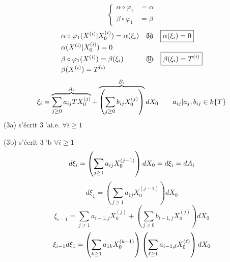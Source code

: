 \[
 \left\{\begin{aligned}\alpha\circ\varphi_1&=\alpha\\\beta\circ\varphi_1&=\beta\end{aligned}\right.
\]
\[
 \begin{array}{ll}
 \alpha\circ\varphi_1({X^{(i)}|X_0^{(i)}})=\alpha(\xi_i)&
 \text{\textcircled{3a}}\quad\boxed{\alpha(\xi_i)=0}\\
 \alpha({X^{(i)}|X_0^{(i)}})=0&\\
 \beta\circ\varphi_1(X^{(i)})=\beta(\xi_i)&
 \text{\textcircled{3b}}\quad\boxed{\beta(\xi_i)=T^{(i)}}\\
 \beta(X^{(i)})=T^{(i)}&
 \end{array}
\]
\[
 \xi_i=\overbrace{\sum_{j\geq0}a_{ij}{{T}}X_0^{(j)}}^{A_i}
 +\overbrace{\left(\sum_{j\geq0}b_{ij}X_0^{(j)}\right)}^{B_i}dX_0
 \qquad {a_{ij}|a_j},b_{ij}\in k\{T\}
\]
(3a) s'écrit
\textcircled{3'a}\quad i.e.
$\forall i\geq1$

(3b) s'écrit
\textcircled{3'b}
$\forall i\geq1$
\[
 d\xi_i=\left(\sum_{j\geq1}a_{ij}X_0^{(j-1)}\right)dX_0
 ={{d\xi_i=dA_i}}
\]
\[
 d\xi_1=\left(\sum_{j\geq1}a_{1j}X_0^{(j-1)}\right)dX_0
\]
\[
 \xi_{i-1}=\sum_{j\geq1}a_{i-1,j}X_0^{(j)}
 +\left(\sum_{j\geq0}b_{i-1,j}X_0^{(j)}\right)dX_0
\]
\[
 \xi_{i-1}d\xi_1=
 \left(\sum_{k\geq1}a_{1k}X_0^{(k-1)}\right)
 \left(\sum_{{\ell}\geq1}a_{i-1,{\ell}}X_0^{({\ell})}\right)dX_0
\]
